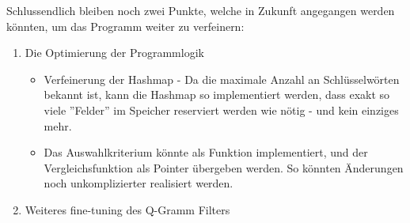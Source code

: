 Schlussendlich bleiben noch zwei Punkte, welche in Zukunft angegangen werden könnten, um das Programm weiter zu verfeinern:
\begin{enumerate}

\item Die Optimierung der Programmlogik \\
    \begin{itemize}
        \item Verfeinerung der Hashmap - Da die maximale Anzahl an Schlüsselwörten bekannt ist, kann die Hashmap so implementiert werden, dass exakt so viele ''Felder'' im Speicher reserviert werden wie nötig - und kein einziges mehr.
        \item Das Auswahlkriterium könnte als Funktion implementiert, und der Vergleichsfunktion als Pointer übergeben werden. So könnten Änderungen noch unkomplizierter realisiert werden.
    \end{itemize}


\item Weiteres fine-tuning des Q-Gramm Filters


\end{enumerate}



